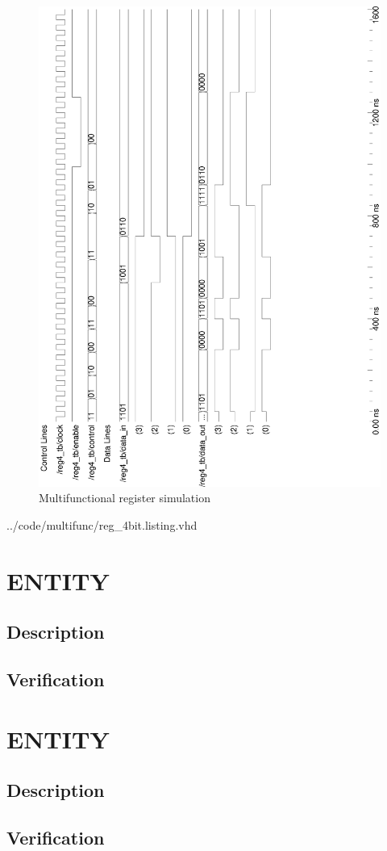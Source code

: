 \documentclass[10pt,a4paper]{report}
\begin{document}
\begin{figure}
\center
\includegraphics[scale=0.4,angle=-90]{graphs/reg_4bit_test.ps}
\caption{\small{Multifunctional register simulation}} \label{wave:reg4}
\end{figure}

\pagebreak

{../code/multifunc/reg_4bit.listing.vhd}

\pagebreak
\section{ENTITY}
\subsection{Description}

\subsection{Verification}

\pagebreak
\section{ENTITY}
\subsection{Description}

\subsection{Verification}
\end{document}
